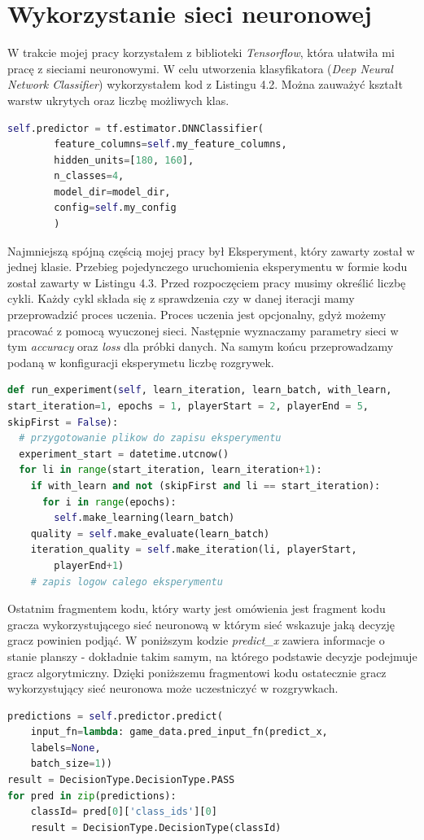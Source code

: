 \documentclass[12pt, oneside]{report}
\begin{document}
\section{Wykorzystanie sieci neuronowej}
W trakcie mojej pracy korzystałem z biblioteki \textit{Tensorflow}, która ułatwiła mi pracę z sieciami 
neuronowymi. W celu utworzenia klasyfikatora (\textit{Deep Neural Network Classifier}) wykorzystałem kod z Listingu 4.2. Można zauważyć kształt warstw ukrytych oraz liczbę możliwych klas.

\begin{lstlisting}[frame=single, language=Python, caption=Konfiguracja klasyfikatora]
 self.predictor = tf.estimator.DNNClassifier(
		feature_columns=self.my_feature_columns,
		hidden_units=[180, 160],
		n_classes=4,
		model_dir=model_dir,
		config=self.my_config
		)
\end{lstlisting}

Najmniejszą spójną częścią mojej pracy był Eksperyment, który zawarty został w jednej klasie. Przebieg pojedynczego uruchomienia eksperymentu w formie kodu został zawarty w Listingu 4.3. Przed rozpoczęciem pracy musimy określić liczbę cykli. Każdy cykl składa się z sprawdzenia czy w danej iteracji mamy przeprowadzić proces uczenia. Proces uczenia jest opcjonalny, gdyż możemy pracować z pomocą wyuczonej sieci. Następnie wyznaczamy parametry sieci w tym \textit{accuracy} oraz \textit{loss} dla próbki danych. Na samym końcu przeprowadzamy podaną w konfiguracji eksperymetu liczbę rozgrywek. 
\begin{lstlisting}[frame=single, language=Python, caption=Funkcja przeprowadzająca pojedynczy eksperyment]
def run_experiment(self, learn_iteration, learn_batch, with_learn, 
start_iteration=1, epochs = 1, playerStart = 2, playerEnd = 5, 
skipFirst = False):
  # przygotowanie plikow do zapisu eksperymentu
  experiment_start = datetime.utcnow()
  for li in range(start_iteration, learn_iteration+1):
    if with_learn and not (skipFirst and li == start_iteration):
      for i in range(epochs):
        self.make_learning(learn_batch)
    quality = self.make_evaluate(learn_batch)
    iteration_quality = self.make_iteration(li, playerStart,
		playerEnd+1)
    # zapis logow calego eksperymentu
\end{lstlisting}

Ostatnim fragmentem kodu, który warty jest omówienia jest fragment kodu gracza wykorzystującego sieć neuronową w którym sieć wskazuje jaką decyzję gracz powinien podjąć. W poniższym kodzie \textit{predict\_x} zawiera informacje o stanie planszy - dokładnie takim samym, na którego podstawie decyzje podejmuje gracz algorytmiczny. Dzięki poniższemu fragmentowi kodu ostatecznie gracz wykorzystujący sieć neuronowa może uczestniczyć w rozgrywkach. 
\begin{lstlisting}[frame=single, language=Python, caption=Wyznaczenie klasy decyzji]
predictions = self.predictor.predict(
	input_fn=lambda: game_data.pred_input_fn(predict_x,
	labels=None,
	batch_size=1))
result = DecisionType.DecisionType.PASS
for pred in zip(predictions):
	classId= pred[0]['class_ids'][0]
	result = DecisionType.DecisionType(classId)
\end{lstlisting}
\end{document}
